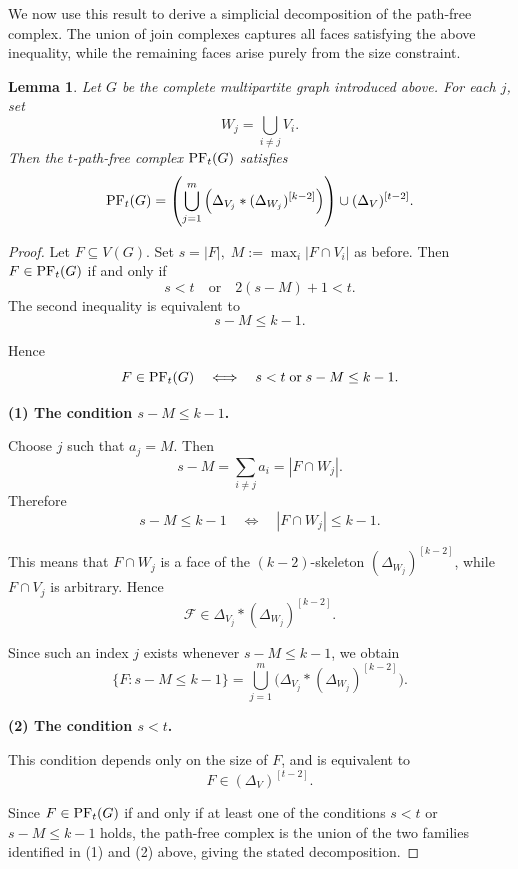 \documentclass[12pt,reqno]{amsart}
\newtheorem{lemma}[lemma]{Lemma}
\theoremstyle{definition}
\def\F{\mathcal{F}}
\newcommand{\PF}{{\rm PF}}
\begin{document}
We now use this result to derive a simplicial decomposition of the path-free complex. 
The union of join complexes captures all faces satisfying the above inequality, while the remaining faces arise purely from the size constraint.

\begin{lemma}\label{lem:decomposition-CMG}
Let $G$ be the complete multipartite graph introduced above. For each $j$, set
\[
W_j = \bigcup_{i \ne j} V_i.
\]
Then the $t$-path-free complex $\PF_t(G)$ satisfies
\begin{equation}\label{eq: structural decomposition}
\PF_t(G)=
\left(
\bigcup_{j=1}^{m}
\left(
\Delta_{V_j} * (\Delta_{W_j})^{[k-2]}
\right)
\right)
\cup
(\Delta_V)^{[t-2]}.
\end{equation}
\end{lemma}


\begin{proof}
Let $F \subseteq V(G)$. Set $s = |F|, \; M := \max_i |F\cap V_i|$ as before. 
Then $F \in \PF_t(G)$ if and only if
\[
s < t \quad \text{or} \quad 2(s-M)+1 < t.
\]
The second inequality
is equivalent to
\[
s - M \le k-1.
\]

Hence
\[ F \in \PF_t(G)
\quad \Longleftrightarrow \quad
s < t \; \text{or} \; s - M \le k-1.
\]

\medskip

\noindent\textbf{(1) The condition $s - M \le k-1$.}

Choose $j$ such that $a_j = M$. Then
\[
s - M = \sum_{i \ne j} a_i = |F \cap W_j|.
\]
Therefore
\[
s - M \le k-1
\quad \Longleftrightarrow \quad
|F \cap W_j| \le k-1.
\]

This means that $F \cap W_j$ is a face of the $(k-2)$-skeleton $(\Delta_{W_j})^{[k-2]}$,
while $F \cap V_j$ is arbitrary. Hence
\[
\F \in \Delta_{V_j} * (\Delta_{W_j})^{[k-2]}.
\]

Since such an index $j$ exists whenever $s-M \le k-1$, we obtain
\[
\{F : s - M \le k-1\} = \bigcup_{j=1}^m
\bigl(
\Delta_{V_j} * (\Delta_{W_j})^{[k-2]}
\bigr).
\]

\medskip

\noindent\textbf{(2) The condition $s < t$.}

This condition depends only on the size of $F$, and is equivalent to
\[
F \in (\Delta_V)^{[t-2]}.
\]

Since $F\in \PF_t(G)$ if and only if at least one of the conditions $s<t$ or $s-M\leq k-1$ holds, the path-free complex is the union of the two families identified in (1) and (2) above, giving the stated decomposition.
\end{proof}
\end{document}
